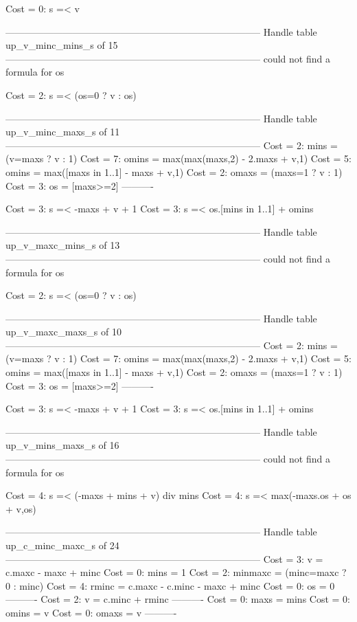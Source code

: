 Cost =  0:  s =< v

--------------------------------------------------------------------------------
Handle table up_v_minc_mins_s of 15
--------------------------------------------------------------------------------
could not find a formula for os

Cost =  2:  s =< (os=0 ? v : os)

--------------------------------------------------------------------------------
Handle table up_v_minc_maxs_s of 11
--------------------------------------------------------------------------------
Cost =  2:  mins  = (v=maxs ? v : 1)
Cost =  7:  omins = max(max(maxs,2) - 2.maxs + v,1)
Cost =  5:  omins = max([maxs in 1..1] - maxs + v,1)
Cost =  2:  omaxs = (maxs=1 ? v : 1)
Cost =  3:  os    = [maxs>=2]
----------

Cost =  3:  s =< -maxs + v + 1
Cost =  3:  s =< os.[mins in 1..1] + omins

--------------------------------------------------------------------------------
Handle table up_v_maxc_mins_s of 13
--------------------------------------------------------------------------------
could not find a formula for os

Cost =  2:  s =< (os=0 ? v : os)

--------------------------------------------------------------------------------
Handle table up_v_maxc_maxs_s of 10
--------------------------------------------------------------------------------
Cost =  2:  mins  = (v=maxs ? v : 1)
Cost =  7:  omins = max(max(maxs,2) - 2.maxs + v,1)
Cost =  5:  omins = max([maxs in 1..1] - maxs + v,1)
Cost =  2:  omaxs = (maxs=1 ? v : 1)
Cost =  3:  os    = [maxs>=2]
----------

Cost =  3:  s =< -maxs + v + 1
Cost =  3:  s =< os.[mins in 1..1] + omins

--------------------------------------------------------------------------------
Handle table up_v_mins_maxs_s of 16
--------------------------------------------------------------------------------
could not find a formula for os

Cost =  4:  s =< (-maxs + mins + v) div mins
Cost =  4:  s =< max(-maxs.os + os + v,os)

--------------------------------------------------------------------------------
Handle table up_c_minc_maxc_s of 24
--------------------------------------------------------------------------------
Cost =  3:  v       = c.maxc - maxc + minc
Cost =  0:  mins    = 1
Cost =  2:  minmaxc = (minc=maxc ? 0 : minc)
Cost =  4:  rminc   = c.maxc - c.minc - maxc + minc
Cost =  0:  os      = 0
----------
Cost =  2:  v       = c.minc + rminc
----------
Cost =  0:  maxs    = mins
Cost =  0:  omins   = v
Cost =  0:  omaxs   = v
----------

